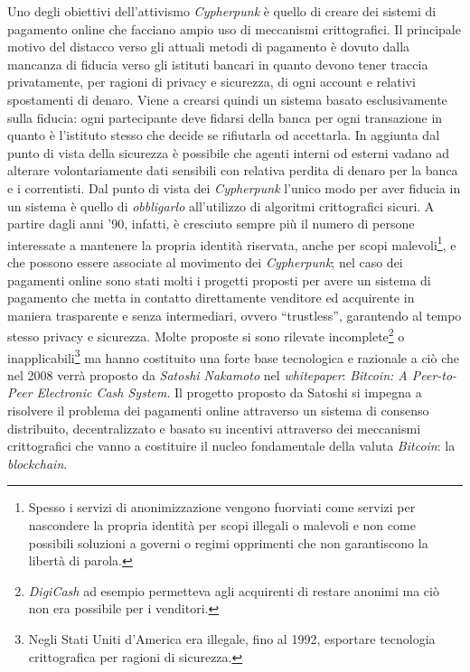 Uno degli obiettivi dell'attivismo \textit{Cypherpunk} è quello di creare dei sistemi di pagamento online che facciano ampio uso di meccanismi crittografici. Il principale motivo del distacco verso gli attuali metodi di pagamento è dovuto dalla mancanza di fiducia verso gli istituti bancari in quanto devono tener traccia privatamente, per ragioni di privacy e sicurezza, di ogni account e relativi spostamenti di denaro. Viene a crearsi quindi un sistema basato esclusivamente sulla fiducia: ogni partecipante deve fidarsi della banca per ogni transazione in quanto è l'istituto stesso che decide se rifiutarla od accettarla. In aggiunta dal punto di vista della sicurezza è possibile che agenti interni od esterni vadano ad alterare volontariamente dati sensibili con relativa perdita di denaro per la banca e i correntisti. Dal punto di vista dei \textit{Cypherpunk} l'unico modo per aver fiducia in un sistema è quello di \textit{obbligarlo} all'utilizzo di algoritmi crittografici sicuri.\newline\newline
A partire dagli anni '90, infatti, è cresciuto sempre più il numero di persone interessate a mantenere la propria identità riservata, anche per scopi malevoli\footnote{Spesso i servizi di anonimizzazione vengono fuorviati come servizi per nascondere la propria identità per scopi illegali o malevoli e non come possibili soluzioni a governi o regimi opprimenti che non garantiscono la libertà di parola.}, e che possono essere associate al movimento dei \textit{Cypherpunk}; nel caso dei pagamenti online sono stati molti i progetti proposti per avere un sistema di pagamento che metta in contatto direttamente venditore ed acquirente in maniera trasparente e senza intermediari, ovvero ``trustless'', garantendo al tempo stesso privacy e sicurezza. Molte proposte si sono rilevate incomplete\footnote{\textit{DigiCash} ad esempio permetteva agli acquirenti di restare anonimi ma ciò non era possibile per i venditori.} o inapplicabili\footnote{Negli Stati Uniti d'America era illegale, fino al 1992, esportare tecnologia crittografica per ragioni di sicurezza.} ma hanno costituito una forte base tecnologica e razionale a ciò che nel 2008 verrà proposto da \textit{Satoshi Nakamoto} nel \textit{whitepaper}: \textit{Bitcoin: A Peer-to-Peer Electronic Cash System}.\newline\newline
Il progetto proposto da Satoshi si impegna a risolvere il problema dei pagamenti online attraverso un sistema di consenso distribuito, decentralizzato e basato su incentivi attraverso dei meccanismi crittografici che vanno a costituire il nucleo fondamentale della valuta \textit{Bitcoin}: la \textit{blockchain}.\newline
